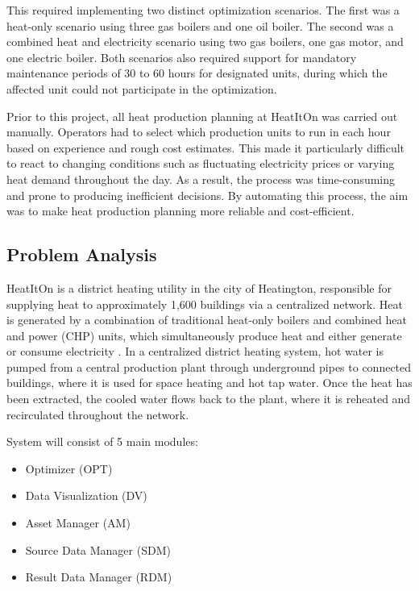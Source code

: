 \hspace*{1cm}This required implementing two distinct optimization 
scenarios. The first was a heat-only scenario using three gas boilers 
and one oil boiler. The second was a combined heat and electricity 
scenario using two gas boilers, one gas motor, and one electric boiler. 
Both scenarios also required support for mandatory maintenance periods 
of 30 to 60 hours for designated units, during which the affected unit 
could not participate in the optimization. 

\hspace*{1cm}Prior to this project, all heat production planning at HeatItOn was 
carried out manually. Operators had to select which production 
units to run in each hour based on experience and rough cost estimates. 
This made it particularly difficult to react to changing conditions 
such as fluctuating electricity prices or varying heat demand 
throughout the day. As a result, the process was time-consuming and prone to 
producing inefficient decisions. By automating this process, the aim was to make heat production planning 
more reliable and cost-efficient.




\subsection*{Problem Analysis}

\hspace*{1cm}HeatItOn is a district heating utility in the city of Heatington, responsible for supplying heat to approximately 1,600 buildings via a centralized network. Heat is generated by a combination of traditional heat-only boilers and combined heat and power (CHP) units, which simultaneously produce heat and either generate or consume electricity \cite{lund20144gdh}. 
In a centralized district heating system, hot water is pumped from a central production plant through underground pipes to connected buildings, where it is used for space heating and hot tap water. Once the heat has been extracted, the cooled water flows back to the plant, where it is reheated and recirculated throughout the network.

System will consist of 5 main modules:

\begin{itemize}
    \item Optimizer (OPT)
    \item Data Visualization (DV)
    \item Asset Manager (AM)
    \item Source Data Manager (SDM)
    \item Result Data Manager (RDM)
\end{itemize}

